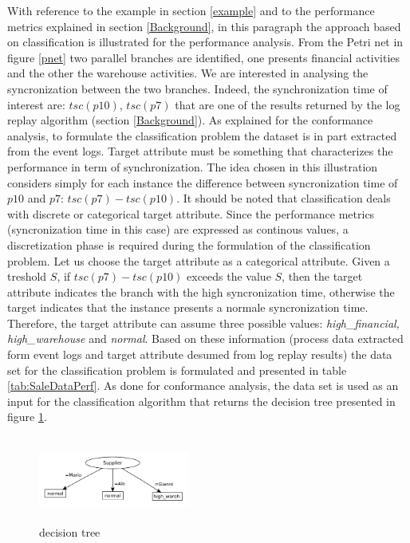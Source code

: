 \documentclass{llncs}
\begin{document}
With reference to the example in section \ref{example} and to the performance metrics explained in section \ref{Background}, in this paragraph the approach based on classification is illustrated for the performance analysis. From the Petri net in figure \ref{pnet} two parallel branches are identified, one presents financial activities and the other the warehouse activities. We are interested in analysing the syncronization between the two branches. Indeed, the synchronization time of interest are: $tsc(p10)$, $tsc(p7)$ that are one of the results returned by the log replay algorithm (section \ref{Background}). As explained for the conformance analysis, to formulate the classification problem the dataset is in part extracted from the event logs. Target attribute must be something that characterizes the performance in term of synchronization. The idea chosen in this illustration considers simply for each instance the difference between syncronization time of $p10$ and $p7$: $tsc(p7) - tsc(p10)$. It should be noted that classification deals with discrete or categorical target attribute. Since the performance metrics (syncronization time in this case) are expressed as continous values, a discretization phase is required  during the formulation of the classification problem. Let us choose the target attribute as a categorical attribute. Given a treshold $S$, if $tsc(p7)- tsc(p10)$ exceeds the value $S$, then the target attribute indicates the branch with the high syncronization time, otherwise the target indicates that the instance presents a normale syncronization time. Therefore, the target attribute can assume three possible values: \emph{high\_financial, high\_warehouse} and \emph{normal}. Based on these information (process data extracted form event logs and target attribute desumed from log replay results) the data set for the classification problem is formulated and presented in table \ref{tab:SaleDataPerf}. As done for conformance analysis, the data set is used as an input for the classification algorithm that returns the decision tree presented in figure \ref{salesPerfDecTree}.\\

\begin{figure}[t]
\centering
\includegraphics[width=140pt,height=80pt]
{./items/Sales_perf_tree.pdf}
\caption{decision tree}
\label{salesPerfDecTree}
\end{figure}
\end{document}
